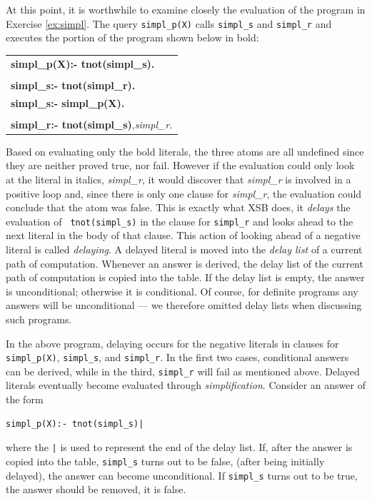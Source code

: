 At this point, it is worthwhile to examine closely the evaluation of
the program in Exercise \ref{ex:simpl}.  The query {\tt simpl\_p(X)}
calls {\tt simpl\_s} and {\tt simpl\_r} and executes the portion of
the program shown below in bold:
\begin{center}
\begin{tabular}{l}
{\bf simpl\_p(X):- tnot(simpl\_s).} \\
\\
{\bf simpl\_s:- tnot(simpl\_r).} \\
{\bf simpl\_s:- simpl\_p(X).} \\
\\
{\bf simpl\_r:- tnot(simpl\_s)},{\it simpl\_r.}
\end{tabular}
\end{center}
Based on evaluating only the bold literals, the three atoms are all
undefined since they are neither proved true, nor fail.  However if
the evaluation could only look at the literal in italics, {\em
  simpl\_r}, it would discover that {\em simpl\_r} is involved in a
positive loop and, since there is only one clause for {\em simpl\_r},
the evaluation could conclude that the atom was false.  This is
exactly what XSB does, it {\em delays} the evaluation of {\tt
  tnot(simpl\_s)} in the clause for {\tt simpl\_r} and looks ahead to
the next literal in the body of that clause.  This action of looking
ahead of a negative literal is called {\em delaying}.  A delayed
literal is moved into the {\em delay list} of a current path of
computation.  Whenever an answer is derived, the delay list of the
current path of computation is copied into the table.  If the delay
list is empty, the answer is unconditional; otherwise it is
conditional.  Of course, for definite programs any answers will be
unconditional --- we therefore omitted delay lists when discussing
such programs.

In the above program, delaying occurs for the negative literals in
clauses for {\tt simpl\_p(X)}, {\tt simpl\_s}, and {\tt simpl\_r}.
In the first two cases, conditional answers can be derived, while in
the third, {\tt simpl\_r} will fail as mentioned above.  Delayed
literals eventually become evaluated through {\em simplification}.
Consider an answer of the form 
\begin{verbatim}
simpl_p(X):- tnot(simpl_s)|
\end{verbatim}
where the {\tt |} is used to represent the end of the delay list.  If,
after the answer is copied into the table, {\tt simpl\_s} turns out to
be false, (after being initially delayed), the answer can become
unconditional.  If {\tt simpl\_s} turns out to be true, the answer
should be removed, it is false.

